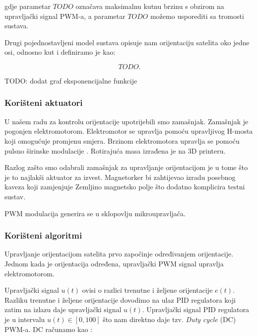 \documentclass[times, utf8, diplomski, numeric]{templates/template}
\begin{document}
{{{{                gdje parametar $TODO$ označava maksimalnu kutnu brzinu s obzirom na upravljački signal PWM-a, a parametar $TODO$ možemo usporediti sa tromosti sustava.
                
                Drugi pojednostavljeni model sustava opisuje nam orijentaciju satelita oko jedne osi, odnosno kut i definiramo je kao:

                \begin{equation}
                    TODO.
                \end{equation}

                TODO: dodat graf eksponencijalne funkcije
            }

            \subsubsection{Korišteni aktuatori}{
                U našem radu za kontrolu orijentacije upotrijebili smo zamašnjak. Zamašnjak je pogonjen elektromotorom. Elektromotor se upravlja pomoću upravljivog H-mosta koji omogućuje promjenu smjera. Brzinom elektromotora upravlja se pomoću pulsno širinske modulacije . Rotirajuća masa izrađena je na 3D printeru.

                Razlog zašto smo odabrali zamašnjak za upravljanje orijentacijom je u tome što je to najlakši aktuator za izvest. Magnetorker bi zahtijevao izradu posebnog kaveza koji zamjenjuje Zemljino magnetsko polje što dodatno komplicira testni sustav.

                PWM modulacija generira se u sklopovlju mikroupravljača.
            }

            \subsubsection{Korišteni algoritmi}{
                Upravljanje orijentacijom satelita prvo započinje određivanjem orijentacije. Jednom kada je orijentacija određena, upravljački PWM signal upravlja elektromotorom.

                Upravljački signal $u(t)$ ovisi o razlici trenutne i željene orijentacije $e(t)$. Razliku trenutne i željene orijentacije dovodimo na ulaz PID regulatora koji zatim na izlazu daje upravljački signal $u(t)$. Upravljački signal PID regulatora je u intervalu $u(t) \in \left[ 0, 100 \right]$ što nam direktno daje tzv. \emph{Duty cycle} (DC) PWM-a. DC računamo kao \cite{dc_pwm}:

}}}}
\end{document}
